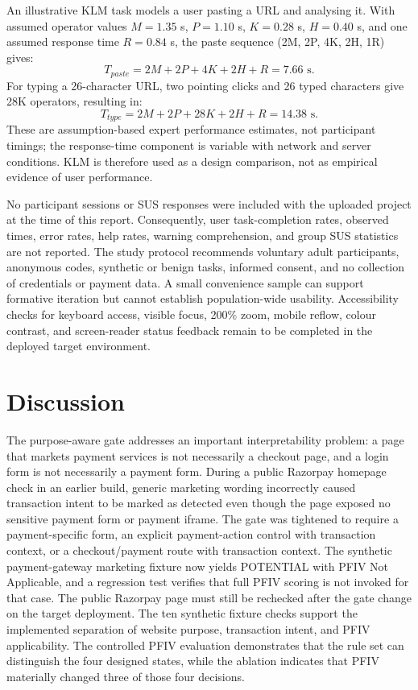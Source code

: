 \documentclass[conference]{IEEEtran}
\begin{document}
An illustrative KLM task models a user pasting a URL and analysing it. With assumed operator values $M=1.35$ s, $P=1.10$ s, $K=0.28$ s, $H=0.40$ s, and one assumed response time $R=0.84$ s, the paste sequence (2M, 2P, 4K, 2H, 1R) gives:
\begin{equation}
T_{paste}=2M+2P+4K+2H+R=7.66\text{ s}.
\end{equation}
For typing a 26-character URL, two pointing clicks and 26 typed characters give 28K operators, resulting in:
\begin{equation}
T_{type}=2M+2P+28K+2H+R=14.38\text{ s}.
\end{equation}
These are assumption-based expert performance estimates, not participant timings; the response-time component is variable with network and server conditions. KLM is therefore used as a design comparison, not as empirical evidence of user performance.

No participant sessions or SUS responses were included with the uploaded project at the time of this report. Consequently, user task-completion rates, observed times, error rates, help rates, warning comprehension, and group SUS statistics are not reported. The study protocol recommends voluntary adult participants, anonymous codes, synthetic or benign tasks, informed consent, and no collection of credentials or payment data. A small convenience sample can support formative iteration but cannot establish population-wide usability. Accessibility checks for keyboard access, visible focus, 200\% zoom, mobile reflow, colour contrast, and screen-reader status feedback remain to be completed in the deployed target environment.

\section{Discussion}
The purpose-aware gate addresses an important interpretability problem: a page that markets payment services is not necessarily a checkout page, and a login form is not necessarily a payment form. During a public Razorpay homepage check in an earlier build, generic marketing wording incorrectly caused transaction intent to be marked as detected even though the page exposed no sensitive payment form or payment iframe. The gate was tightened to require a payment-specific form, an explicit payment-action control with transaction context, or a checkout/payment route with transaction context. The synthetic payment-gateway marketing fixture now yields POTENTIAL with PFIV Not Applicable, and a regression test verifies that full PFIV scoring is not invoked for that case. The public Razorpay page must still be rechecked after the gate change on the target deployment. The ten synthetic fixture checks support the implemented separation of website purpose, transaction intent, and PFIV applicability. The controlled PFIV evaluation demonstrates that the rule set can distinguish the four designed states, while the ablation indicates that PFIV materially changed three of those four decisions.
\end{document}
